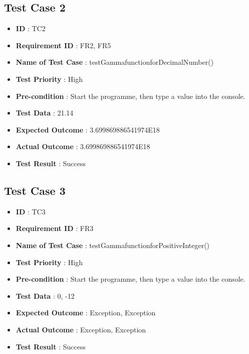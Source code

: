 \documentclass[12pt,a4paper]{report}
\begin{document}
\subsection{Test Case 2}
\begin{itemize}
    \item \textbf{ID} : TC2
    \item \textbf{Requirement ID} : FR2, FR5
    \item \textbf{Name of Test Case} : testGammafunctionforDecimalNumber()
    \item \textbf{Test Priority} : High
    \item \textbf{Pre-condition} : Start the programme, then type a value into the console.
    \item \textbf{Test Data} : 21.14
    \item \textbf{Expected Outcome} : 3.699869886541974E18
    \item \textbf{Actual Outcome} : 3.699869886541974E18
    \item \textbf{Test Result} : Success
\end{itemize}

\subsection{Test Case 3}
\begin{itemize}
    \item \textbf{ID} : TC3
    \item \textbf{Requirement ID} : FR3
    \item \textbf{Name of Test Case} : testGammafunctionforPositiveInteger()
    \item \textbf{Test Priority} : High
    \item \textbf{Pre-condition} : Start the programme, then type a value into the console.
    \item \textbf{Test Data} : 0, -12
    \item \textbf{Expected Outcome} : Exception, Exception
    \item \textbf{Actual Outcome} : Exception, Exception
    \item \textbf{Test Result} : Success
\end{itemize}
\end{document}
